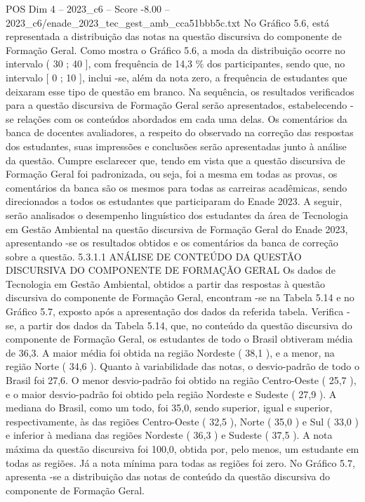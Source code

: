 \begin{textsample}{POS Dim 4 – 2023\_c6 – Score -8.00 – 2023\_c6/enade\_2023\_tec\_gest\_amb\_cca51bbb5c.txt}
No Gráfico 5.6, está representada a distribuição das notas na questão discursiva do componente de Formação Geral.
Como mostra o Gráfico 5.6, a moda da distribuição ocorre no intervalo ( 30 ; 40 ], com frequência de 14,3 \% dos participantes, sendo que, no intervalo [ 0 ; 10 ], inclui -se, além da nota zero, a frequência de estudantes que deixaram esse tipo de questão em branco.
Na sequência, os resultados verificados para a questão discursiva de Formação Geral serão apresentados, estabelecendo -se relações com os conteúdos abordados em cada uma delas.
Os comentários da banca de docentes avaliadores, a respeito do observado na correção das respostas dos estudantes, suas impressões e conclusões serão apresentadas junto à análise da questão.
Cumpre esclarecer que, tendo em vista que a questão discursiva de Formação Geral foi padronizada, ou seja, foi a mesma em todas as provas, os comentários da banca são os mesmos para todas as carreiras acadêmicas, sendo direcionados a todos os estudantes que participaram do Enade 2023.
A seguir, serão analisados o desempenho linguístico dos estudantes da área de Tecnologia em Gestão Ambiental na questão discursiva de Formação Geral do Enade 2023, apresentando -se os resultados obtidos e os comentários da banca de correção sobre a questão. 5.3.1.1 ANÁLISE DE CONTEÚDO DA QUESTÃO DISCURSIVA DO COMPONENTE DE FORMAÇÃO GERAL Os dados de Tecnologia em Gestão Ambiental, obtidos a partir das respostas à questão discursiva do componente de Formação Geral, encontram -se na Tabela 5.14 e no Gráfico 5.7, exposto após a apresentação dos dados da referida tabela.
Verifica -se, a partir dos dados da Tabela 5.14, que, no conteúdo da questão discursiva do componente de Formação Geral, os estudantes de todo o Brasil obtiveram média de 36,3.
A maior média foi obtida na região Nordeste ( 38,1 ), e a menor, na região Norte ( 34,6 ).
Quanto à variabilidade das notas, o desvio-padrão de todo o Brasil foi 27,6.
O menor desvio-padrão foi obtido na região Centro-Oeste ( 25,7 ), e o maior desvio-padrão foi obtido pela região Nordeste e Sudeste ( 27,9 ).
A mediana do Brasil, como um todo, foi 35,0, sendo superior, igual e superior, respectivamente, às das regiões Centro-Oeste ( 32,5 ), Norte ( 35,0 ) e Sul ( 33,0 ) e inferior à mediana das regiões Nordeste ( 36,3 ) e Sudeste ( 37,5 ).
A nota máxima da questão discursiva foi 100,0, obtida por, pelo menos, um estudante em todas as regiões.
Já a nota mínima para todas as regiões foi zero.
No Gráfico 5.7, apresenta -se a distribuição das notas de conteúdo da questão discursiva do componente de Formação Geral.

\end{textsample}

